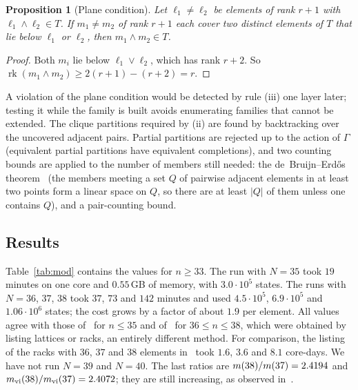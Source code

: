 \documentclass[11pt]{amsart}
\newtheorem{proposition}[theorem]{Proposition}
\theoremstyle{definition}
\theoremstyle{remark}
\newcommand{\rk}{\operatorname{rk}}
\begin{document}
\begin{proposition}[Plane condition]\label{prop:plane}
Let $\ell_1 \ne \ell_2$ be elements of rank $r+1$ with $\ell_1 \wedge \ell_2 \in T$.  If
$m_1 \ne m_2$ of rank $r+1$ each cover two distinct elements of $T$ that lie below $\ell_1$ or
$\ell_2$, then $m_1 \wedge m_2 \in T$.
\end{proposition}

\begin{proof}
Both $m_i$ lie below $\ell_1 \vee \ell_2$, which has rank $r+2$.  So
$\rk(m_1 \wedge m_2) \ge 2(r+1) - (r+2) = r$.
\end{proof}

A violation of the plane condition would be detected by rule (iii) one layer later; testing
it while the family is built avoids enumerating families that cannot be extended.  The
clique partitions required by (ii) are found by backtracking over the uncovered adjacent
pairs.  Partial partitions are rejected up to the action of $\Gamma$ (equivalent partial
partitions have equivalent completions), and two counting bounds are applied to the
number of members still needed: the de~Bruijn--Erd\H{o}s theorem~\cite{dBE} (the members
meeting a set $Q$ of pairwise adjacent elements in at least two points form a linear space
on $Q$, so there are at least $|Q|$ of them unless one contains $Q$), and a pair-counting
bound.

\subsection{Results}
Table~\ref{tab:mod} contains the values for $n \ge 33$.  The run with $N=35$ took $19$
minutes on one core and $0.55$\,GB of memory, with $3.0\cdot 10^5$ states.  The runs with
$N=36$, $37$, $38$ took $37$, $73$ and $142$ minutes and used $4.5\cdot 10^5$,
$6.9\cdot 10^5$ and $1.06\cdot 10^6$ states; the cost grows by a factor of about $1.9$ per
element.  All values agree with those of~\cite{Koh21} for $n \le 35$ and
of~\cite[Table~1]{Koh23} for $36 \le n \le 38$, which were obtained by listing lattices or
racks, an entirely different method.  For comparison, the listing of the racks with $36$, $37$
and $38$ elements in~\cite{Koh23} took $1.6$, $3.6$ and $8.1$ core-days.  We have not
run $N = 39$ and $N = 40$.  The last
ratios are $m(38)/m(37) = 2.4194$ and
$m_{\mathrm{vi}}(38)/m_{\mathrm{vi}}(37) = 2.4072$; they are still increasing,
as observed in~\cite{Koh21}.

\begin{table}[ht]
\tablemod
\caption{Values of $m(n)$ (A006981) and $m_{\mathrm{vi}}(n)$ (A342132) computed with the
transfer matrix.  They agree with~\cite{Koh21} ($n \le 35$) and~\cite{Koh23}
($n \le 38$).}\label{tab:mod}
\end{table}
\end{document}
